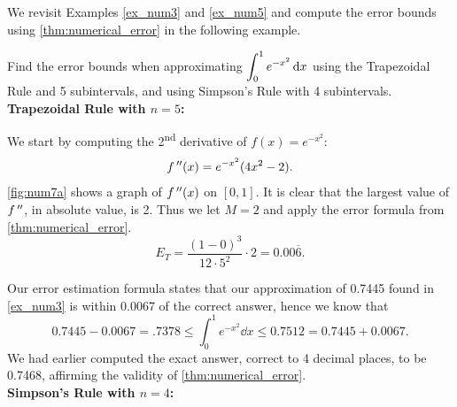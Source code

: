 We revisit Examples \ref{ex_num3} and \ref{ex_num5} and compute the error bounds using \autoref{thm:numerical_error} in the following example.

\begin{example}\label{ex_num7}%
Find the error bounds when approximating $\displaystyle \int_0^1 e^{-x^2}\operatorname{d}\! x$ using the Trapezoidal Rule and 5 subintervals, and using Simpson's Rule with 4 subintervals.
\solution
\textbf{Trapezoidal Rule with $n=5$:}

We start by computing the 2\textsuperscript{nd} derivative of $f(x) = e^{-x^2}$:
%
%
\[f\,''(x) = e^{-x^2}(4x^2-2).\]
\autoref{fig:num7a} shows a graph of $f\,''(x)$ on $[0,1]$. It is clear that the largest value of $f\,''$, in absolute value, is 2. Thus we let $M=2$ and apply the error formula from \autoref{thm:numerical_error}.
\[E_T = \frac{(1-0)^3}{12\cdot 5^2}\cdot 2 = 0.00\overline{6}.\]

Our error estimation formula states that our approximation of 0.7445 found in \autoref{ex_num3} is within 0.0067 of the correct answer, hence we know that
\[0.7445-0.0067 = .7378 \leq \int_0^1e^{-x^2}\dd x \leq 0.7512 = 0.7445 + 0.0067.\]
We had earlier computed the exact answer, correct to 4 decimal places, to be 0.7468, affirming the validity of \autoref{thm:numerical_error}.\bigskip\\
\textbf{Simpson's Rule with $n=4$:}


\end{example}
